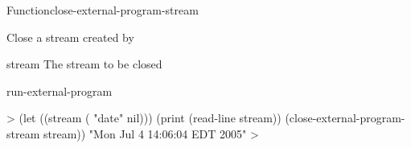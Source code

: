 \documentclass[10pt,twoside,english,pdftex]{article}
\begin{document}

\begin{functiondoc}{Function}{close-external-program-stream}{}
%
%

\fnsyntax

%
\fnpurpose Close a stream created by

\fnpackage {}

\fnmodule {}

\fnargs
\begin{args}{stream}
\arg[stream] The stream to be closed
\end{args}

\begin{alsos}{run-external-program}
\end{alsos}

%
\fnexample
%
\W\supp
\begin{example}
  > (let ((stream ( "date" nil)))
       (print (read-line stream))
       (close-external-program-stream stream))
  "Mon Jul  4 14:06:04 EDT 2005" 
  >
\end{example}

\end{functiondoc}

\end{document}
